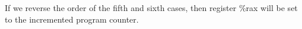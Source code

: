 \documentclass{article}
\begin{document}
If we reverse the order of the fifth and sixth cases, then register \%rax
will be set to the incremented program counter.
\end{document}
